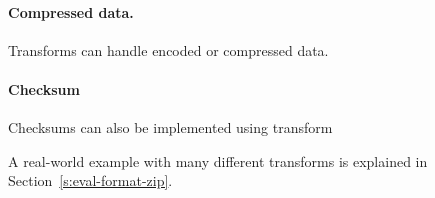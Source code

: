 \paragraph{Compressed data.}
Transforms can handle encoded or compressed data. \XXX[More]
\paragraph{Checksum}
Checksums can also be implemented using transform \XXX[How?]


\noindent A real-world example with many different transforms is explained in Section~\ref{s:eval-format-zip}.
 






